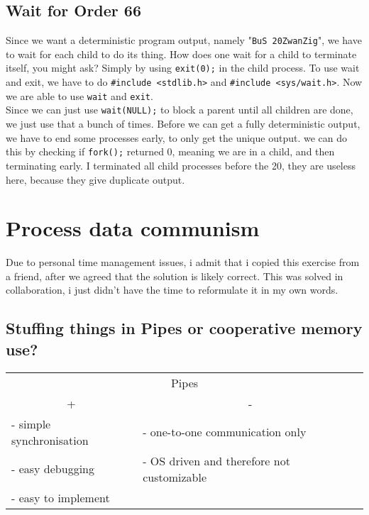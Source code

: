 \documentclass[a4paper, 11pt]{article}
\begin{document}
    \subsection{Wait for Order 66}
    Since we want a deterministic program output, namely "\texttt{BuS 20ZwanZig}", we have to wait for each child to do its thing.
    How does one wait for a child to terminate itself, you might ask? Simply by using \lstinline{exit(0);} in the child process. 
    To use wait and exit, we have to do \lstinline{#include <stdlib.h>} and \lstinline{#include <sys/wait.h>}.
    Now we are able to use \lstinline{wait} and \lstinline{exit}.\\
    Since we can just use \lstinline{wait(NULL);} to block a parent until all children are done, we just use that a bunch of times.
    Before we can get a fully deterministic output, we have to end some processes early, to only get the unique output. we can do 
    this by checking if \lstinline{fork();} returned 0, meaning we are in a child, and then terminating early. I terminated all child
    processes before the 20, they are useless here, because they give duplicate output.  
    \newpage
    
    \newpage

    \section{Process data communism}
      Due to personal time management issues, i admit that i copied this exercise from a friend, after we agreed that the solution is likely correct.
      This was solved in collaboration, i just didn't have the time to reformulate it in my own words.
      \subsection{Stuffing things in Pipes or cooperative memory use?}
      \begin{table}[h]
            \begin{tabular}{@{}llll@{}}
                  \multicolumn{4}{c}{Pipes}                                                                                      \\
                  \multicolumn{2}{c}{+}                         & \multicolumn{2}{c}{-}                                          \\ \midrule
                  \multicolumn{2}{l|}{- simple synchronisation} & \multicolumn{2}{l}{- one-to-one communication only}            \\
                  \multicolumn{2}{l|}{- easy debugging}         & \multicolumn{2}{l}{- OS driven and therefore not customizable} \\
                  \multicolumn{2}{l|}{- easy to implement}      & \multicolumn{2}{l}{}                                          
            \end{tabular}
      \end{table}
\end{document}
